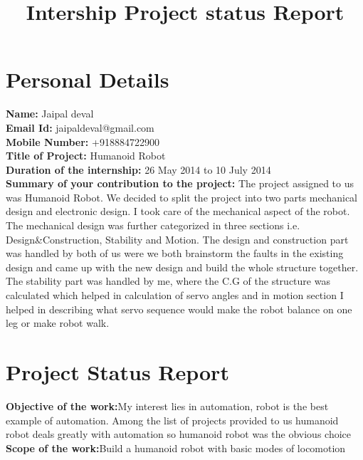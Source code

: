 \documentclass{article}
\begin{document}
\title{Intership Project status Report}
\maketitle
\section{Personal Details}
\textbf{Name:} Jaipal deval\\

\hspace{-5mm}\textbf{Email Id:} jaipaldeval@gmail.com\\

\hspace{-5mm}\textbf{Mobile Number:} +918884722900\\

\hspace{-5mm}\textbf{Title of Project:} Humanoid Robot\\

\hspace{-5mm}\textbf{Duration of the internship:} 26 May 2014 to 10 July 2014\\

\hspace{-5mm}\textbf{Summary of your contribution to the project:} The project assigned to us was Humanoid Robot. We decided to split the project into two parts mechanical design and electronic design. I took care of the mechanical aspect of the robot. The mechanical design was further categorized in three sections i.e. Design\&Construction, Stability and Motion. The design and construction part was handled by both of us were we both brainstorm the faults in the existing design and came up with the new design and build the whole structure together. The stability part was handled by me, where the C.G of the structure was calculated which helped in calculation of servo angles and in motion section I helped in describing what servo sequence would make the robot balance on one leg or make robot walk.
\section{Project Status Report}
\textbf{Objective of the work:}My interest lies in automation, robot is the best example of automation. Among the list of projects provided to us humanoid robot deals greatly with automation so humanoid robot was the obvious choice\\

\hspace{-5mm}\textbf{Scope of the work:}Build a humanoid robot with basic modes of locomotion\\ 
\end{document}
